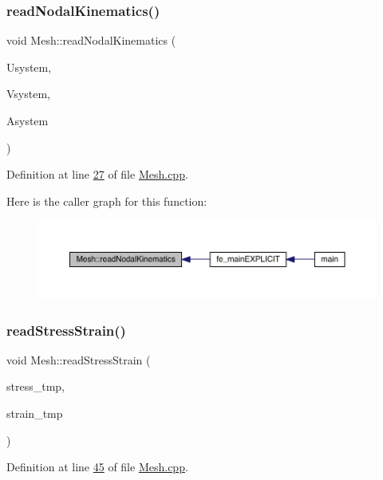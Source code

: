 \subsubsection{\texorpdfstring{read\+Nodal\+Kinematics()}{readNodalKinematics()}}
{\footnotesize\ttfamily void Mesh\+::read\+Nodal\+Kinematics (\begin{DoxyParamCaption}\item[{Vector\+Xd}]{Usystem,  }\item[{Vector\+Xd}]{Vsystem,  }\item[{Vector\+Xd}]{Asystem }\end{DoxyParamCaption})}



Definition at line \hyperlink{_mesh_8cpp_source_l00027}{27} of file \hyperlink{_mesh_8cpp_source}{Mesh.\+cpp}.

Here is the caller graph for this function\+:\nopagebreak
\begin{figure}[H]
\begin{center}
\leavevmode
\includegraphics[width=350pt]{class_mesh_a2193a797388525febbac794d17bea23e_icgraph}
\end{center}
\end{figure}
\mbox{\label{class_mesh_a2c1456f1b3b5bda8d213624e3943dbb3}} 
\subsubsection{\texorpdfstring{read\+Stress\+Strain()}{readStressStrain()}}
{\footnotesize\ttfamily void Mesh\+::read\+Stress\+Strain (\begin{DoxyParamCaption}\item[{Matrix\+Xd}]{stress\+\_\+tmp,  }\item[{Matrix\+Xd}]{strain\+\_\+tmp }\end{DoxyParamCaption})}



Definition at line \hyperlink{_mesh_8cpp_source_l00045}{45} of file \hyperlink{_mesh_8cpp_source}{Mesh.\+cpp}.

